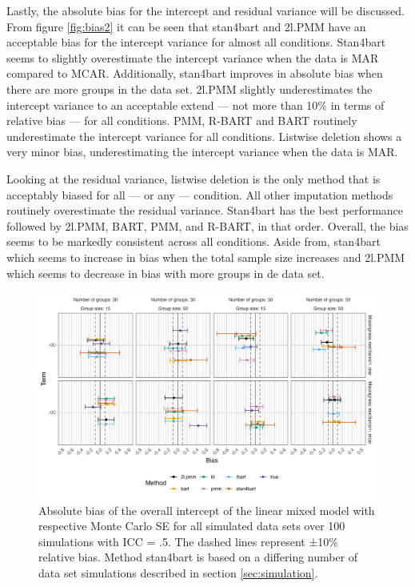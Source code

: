 \documentclass[10pt, a4paper, titlepage]{article}
\begin{document}

Lastly, the absolute bias for the intercept and residual variance will be discussed. From figure \ref{fig:bias2} it can be seen that stan4bart and 2l.PMM have an acceptable bias for the intercept variance for almost all conditions. Stan4bart seems to slightly overestimate the intercept variance when the data is MAR compared to MCAR. Additionally, stan4bart improves in absolute bias when there are more groups in the data set. 2l.PMM slightly underestimates the intercept variance to an acceptable extend --- not more than 10\% in terms of relative bias --- for all conditions. PMM, R-BART and BART routinely underestimate the intercept variance for all conditions. Listwise deletion shows a very minor bias, underestimating the intercept variance when the data is MAR. 

Looking at the residual variance, listwise deletion is the only method that is acceptably biased for all --- or any --- condition. All other imputation methods routinely overestimate the residual variance. Stan4bart has the best performance followed by 2l.PMM, BART, PMM, and R-BART, in that order. Overall, the bias seems to be markedly consistent across all conditions. Aside from, stan4bart which seems to increase in bias when the total sample size increases and 2l.PMM which seems to decrease in bias with more groups in de data set. 

\begin{figure}[H]
    \centering
    \includegraphics[width=1\textwidth]{biasintercept.png}
    \caption{Absolute bias of the overall intercept of the linear mixed model with respective Monte Carlo SE for all simulated data sets over 100 simulations with ICC = .5. The dashed lines represent ±10\% relative bias. Method stan4bart is based on a differing number of data set simulations described in section \ref{sec:simulation}.}
    \label{fig:biasintercept}
\end{figure}
\end{document}
